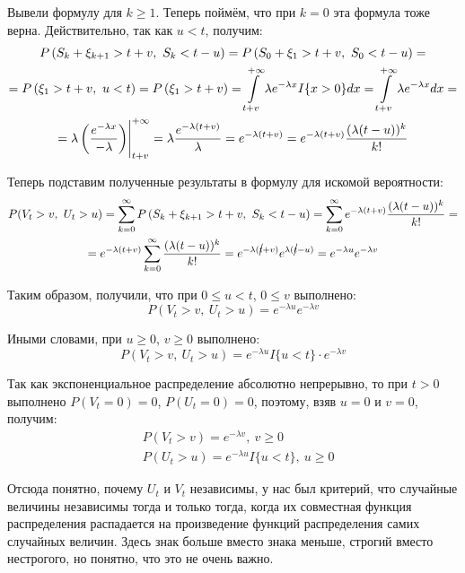 \begin{solution}
    Вывели формулу для $k \ge 1$. Теперь поймём, что при $k = 0$ эта формула тоже верна. Действительно, так как $u < t$, получим:
    \begin{multline*}
        P\left(S_k + \xi_{k+1} > t + v,\ S_k < t - u\right) = P\left(S_0 + \xi_1 > t + v,\ S_0 < t - u\right) =
        \\
        = P\left(\xi_1 > t + v,\ u < t\right) = P\left(\xi_1 > t + v\right) = \int\limits_{t+v}^{+\infty} \lambda e^{-\lambda x} I\{x > 0\} dx = \int\limits_{t+v}^{+\infty} \lambda e^{-\lambda x} dx =
        \\
        = \lambda \left(\frac{e^{-\lambda x}}{-\lambda}\right) \Biggr|_{t+v}^{+\infty} = \lambda \frac{e^{-\lambda (t+v)}}{\lambda} = e^{-\lambda (t+v)} = e^{-\lambda (t+v)} \frac{(\lambda(t-u))^k}{k!}
    \end{multline*}

    Теперь подставим полученные результаты в формулу для искомой вероятности:
    \begin{multline*}
        P(V_t > v,\ U_t > u) = \sum_{k=0}^{\infty} P\left(S_k + \xi_{k+1} > t + v,\ S_k < t - u\right) = \sum_{k=0}^\infty e^{-\lambda (t+v)} \frac{(\lambda(t-u))^k}{k!} =
        \\
        = e^{-\lambda (t+v)} \sum_{k=0}^\infty \frac{(\lambda(t-u))^k}{k!} = e^{-\lambda (\cancel{t}+v)} e^{\lambda (\cancel{t}-u)} = e^{-\lambda u} e^{-\lambda v}
    \end{multline*}

    Таким образом, получили, что при $0 \le u < t$, $0 \le v$ выполнено:
    \[
        P(V_t > v,\ U_t > u) = e^{-\lambda u} e^{-\lambda v}
    \]

    Иными словами, при $u \ge 0$, $v \ge 0$ выполнено:
    \[
        P(V_t > v,\ U_t > u) = e^{-\lambda u} I\{u < t\} \cdot e^{-\lambda v} 
    \]

    Так как экспоненциальное распределение абсолютно непрерывно, то при $t > 0$ выполнено $P(V_t = 0) = 0$, $P(U_t = 0) = 0$, поэтому, взяв $u = 0$ и $v = 0$, получим:
    \begin{align*}
        & P(V_t > v) = e^{-\lambda v},\ v \ge 0
        \\
        & P(U_t > u) = e^{-\lambda u} I\{u < t\},\ u \ge 0
    \end{align*}

    Отсюда понятно, почему $U_t$ и $V_t$ независимы, у нас был критерий, что случайные величины независимы тогда и только тогда, когда их совместная функция распределения распадается на произведение функций распределения самих случайных величин. Здесь знак больше вместо знака меньше, строгий вместо нестрогого, но понятно, что это не очень важно.


\end{solution}
